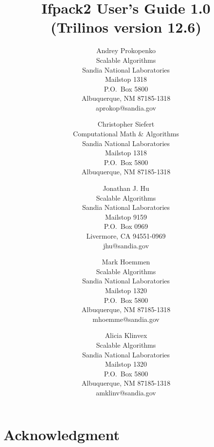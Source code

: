 \documentclass[pdf,12pt,report]{SANDreport}
\title{Ifpack2 User's Guide 1.0 \\
(Trilinos version 12.6)}
\author{
  Andrey Prokopenko \\
  Scalable Algorithms \\
  Sandia National Laboratories\\
  Mailstop 1318 \\
  P.O.~Box 5800 \\
  Albuquerque, NM 87185-1318\\
  aprokop@sandia.gov\\
  \and
  Christopher Siefert \\
  Computational Math \& Algorithms \\
  Sandia National Laboratories\\
  Mailstop 1318 \\
  P.O.~Box 5800 \\
  Albuquerque, NM 87185-1318 \\
  \and
  Jonathan J. Hu \\
  Scalable Algorithms \\
  Sandia National Laboratories\\
  Mailstop 9159 \\
  P.O.~Box 0969 \\
  Livermore, CA 94551-0969\\
  jhu@sandia.gov \\
  \and
  Mark Hoemmen \\
  Scalable Algorithms \\
  Sandia National Laboratories\\
  Mailstop 1320 \\
  P.O.~Box 5800 \\
  Albuquerque, NM 87185-1318\\
  mhoemme@sandia.gov\\
  \and
  Alicia Klinvex \\
  Scalable Algorithms \\
  Sandia National Laboratories\\
  Mailstop 1320 \\
  P.O.~Box 5800 \\
  Albuquerque, NM 87185-1318\\
  amklinv@sandia.gov\\
}
\date{}
\begin{document}
    \maketitle

    \begin{abstract}
	
    \end{abstract}


    \clearpage
    \chapter*{Acknowledgment}
	

    \cleardoublepage		%
    \tableofcontents
    \listoffigures
    \listoftables




\end{document}
